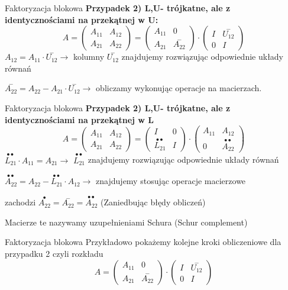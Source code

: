 \begin{frame}{Faktoryzacja blokowa}
\textbf{Przypadek 2) L,U- trójkatne, ale z identycznościami na przekątnej w U:}
$$
A=\left(\begin{array}{ll}
A_{11} & A_{12}\\
A_{21} & A_{22}
\end{array}\right)=\left(\begin{array}{ll}
A_{11} & 0\\
A_{21} & \overset{-}{A_{22}}
\end{array}\right)\cdot \left(\begin{array}{ll}
I & \overset{-}{U_{12}}\\
0 & I
\end{array}\right)
$$
$ A_{12}=A_{11}\cdot \overset{-}{U_{12}}\rightarrow$ kolumny  $\overset{-}{U_{12}}$ znajdujemy rozwiązując odpowiednie układy równań

$ \overset{-}{A_{22}}=A_{22}-A_{21}\cdot \overset{-}{U_{12}}\rightarrow$ obliczamy wykonując operacje na macierzach.

\end{frame}
\begin{frame}{Faktoryzacja blokowa}
\textbf{Przypadek 2) L,U- trójkatne, ale z identycznościami na przekątnej w L}
$$
A=\left(\begin{array}{ll}
A_{11} & A_{12}\\
A_{21} & A_{22}
\end{array}\right)=\left(\begin{array}{ll}
I & 0\\
\overset{\bullet \bullet}{L_{21}} & I
\end{array}\right)\cdot \left(\begin{array}{ll}
A_{11} & A_{12}\\
 0 & \overset{\bullet \bullet}{A_{22}}
\end{array}\right)
$$
$ \overset{\bullet \bullet}{L_{21}}\cdot A_{11}=A_{21}\rightarrow$ 
$\overset{\bullet \bullet}{L_{21}}$ znajdujemy rozwiązując odpowiednie układy równań 

$ \overset{\bullet \bullet}{A_{22}}=A_{22}-\overset{\bullet \bullet}{L_{21}}\cdot A_{12}\rightarrow$ znajdujemy stosując operacje macierzowe

zachodzi $\overset{\bullet}{A_{22}}=\overset{-}{A_{22}}=\overset{\bullet \bullet}{A_{22}}$
(Zaniedbując błędy obliczeń)

Macierze te nazywamy uzupełnieniami Schura (Schur complement)
\end{frame}
\begin{frame}{Faktoryzacja blokowa}
Przykładowo pokażemy kolejne kroki obliczeniowe dla przypadku 2 czyli rozkładu
$$
A=\left(\begin{array}{ll}
A_{11} & 0\\
A_{21} & \overset{-}{A_{22}}
\end{array}\right)\cdot \left(\begin{array}{ll}
I & \overset{-}{U_{12}}\\
0 & I
\end{array}\right)
$$



\end{frame}
